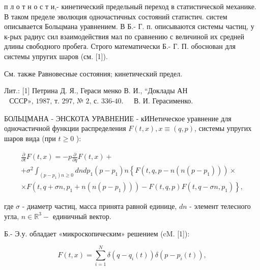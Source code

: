 \documentclass[10pt]{article}
\begin{document}
п л о т н о с т и,- кинетический предельный переход в статистической механике. В таком пределе эволюция одночастичных состояний статистич. систем описывается Больцмана уравнением. В Б.- Г. п. описываются системы частиц, у к-рых радиус сил взаимодействия мал по сравнению с величиной их средней длины свободного пробега. Строго математически Б.- Г. П. обоснован для системы упругих шаров (см. [1]).



См. также Равновесные состояния; кинетический предел.



Лит.: [1] Петрина Д. Я., Гераси менко В. И., “Доклады АН $\begin{array}{lll}\text { СССР», 1987, т. 297, № 2, с. 336-40. } & \text { В. И. Герасименко. }\end{array}$



БОЛЬЦМАНА - ЭНСКОТА УРАВНЕНИЕ - кИНетическое уравнение для одночастичной функции распределения $F(t, x), x \equiv(q, p)$, системы упругих шаров вида (при $t \geqslant 0$ ):



\[

\begin{gathered}

\frac{\partial}{\partial t} F(t, x)=-p \frac{\partial}{\partial q} F(t, x)+ \\

+\sigma^{2} \int_{\left(p-p_{1}\right) n \geqslant 0} d n d p_{1}\left(p-p_{1}\right) n\left\{F\left(t, q, p-n\left(n\left(p-p_{1}\right)\right)\right) \times\right. \\

\left.\times F\left(t, q+\sigma n, p_{1}+n\left(n\left(p-p_{1}\right)\right)\right)-F(t, q, p) F\left(t, q-\sigma n, p_{1}\right)\right\},

\end{gathered}

\]



где $\sigma$ - диаметр частиц, масса принята равной единице, $d n$ - элемент телесного угла, $n \in \mathbb{R}^{3}-$ единичный вектор.



Б.- Э.у. обладает «микроскопическим» решением (cM. [1]):



\[

F(t, x)=\sum_{i=1}^{N} \delta\left(q-q_{i}(t)\right) \delta\left(p-p_{i}(t)\right),

\]
\end{document}
